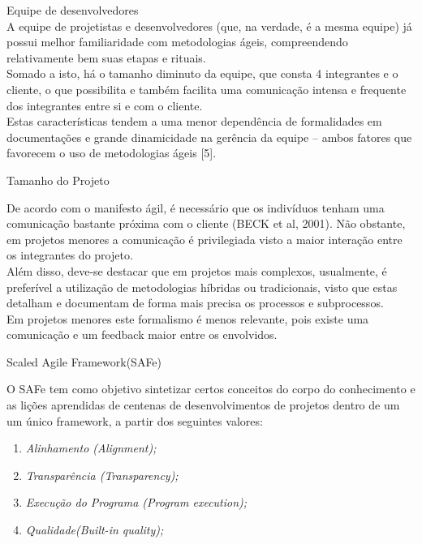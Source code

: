 {
	\large{Equipe de desenvolvedores\\

	\tab A equipe de projetistas e desenvolvedores (que, na verdade, é a mesma equipe) já possui melhor familiaridade com metodologias ágeis, compreendendo relativamente bem suas etapas e rituais. \\
	\tab Somado a isto, há o tamanho diminuto da equipe, que consta 4 integrantes e o cliente, o que possibilita e também facilita uma comunicação intensa e frequente dos integrantes entre si e com o cliente. \\
	\tab Estas características tendem a uma menor dependência de formalidades em documentações e grande dinamicidade na gerência da equipe – ambos fatores que favorecem o uso de metodologias ágeis [5]. \\
}

{
	\large{Tamanho do Projeto\\}

	\tab De acordo com o manifesto ágil, é necessário que os indivíduos tenham uma comunicação bastante próxima com o cliente (BECK et al, 2001). Não obstante, em projetos menores a comunicação é privilegiada visto a maior interação entre os integrantes do projeto. \\
	\tab Além disso, deve-se destacar que em projetos mais complexos, usualmente,  é preferível a utilização de metodologias híbridas ou tradicionais, visto que estas detalham e documentam de forma mais precisa os processos e subprocessos. \\
	\tab Em projetos menores este formalismo é menos relevante, pois existe uma comunicação e um feedback maior entre os envolvidos. \\
}

{
	\large{Scaled Agile Framework(SAFe)\\}

	\tab O SAFe  tem como objetivo sintetizar certos conceitos do corpo do conhecimento e as lições aprendidas de centenas de desenvolvimentos de projetos  dentro de um um único framework, a partir dos seguintes valores:\\

	\begin{enumerate}
		\item \textsl{Alinhamento (Alignment);}
		\item \textsl{Transparência (Transparency);}
		\item \textsl{Execução do Programa (Program execution);}
		\item \textsl{Qualidade(Built-in quality);}
	\end{enumerate}

}}
